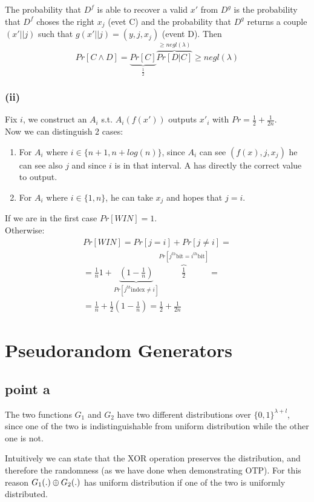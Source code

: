 \documentclass[11pt]{article}
\newcounter{t0d0_counter}
\begin{document}
The probability that $D^f$ is able to recover a valid $x'$ from $D^g$ is the probability that $D^f$ choses the right $x_j$ (evet C) and the probability that $D^g$ returns a couple $(x'||j)$ such that $g(x'||j)=(y,j,x_j)$ (event D). Then \[
Pr[C\wedge D]=\underbrace{Pr[C]}_{\frac{1}{2}}\overbrace{Pr[D|C]}^{\geq negl(\lambda)}\geq negl(\lambda)
\]

\subsubsection{(ii)}

Fix $i$, we construct an $A_i$ s.t. $A_i(f(x\prime))$ outputs $x\prime _i$ with $Pr=\frac{1}{2}+\frac{1}{2n}$.\\
Now we can distinguish 2 cases:
\begin{enumerate}
   \item For $A_i$ where $i \in \{n+1, n+log(n)\}$, since $A_i$ can see $(f(x),j,x_j)$ he can see also $j$ and since $i$ is in that interval. A has directly the correct value to output.
   \item For $A_i$ where $i \in \{1, n\}$, he can take $x_j$ and hopes that $j=i$.
\end{enumerate}

\noindent If we are in the first case $Pr[WIN]=1$.\\
Otherwise: \\
\begin{gather*}
   Pr[WIN]=Pr[j=i]+Pr[j \neq i]=\\
   =\frac{1}{n}1 +\underbrace{(1-\frac{1}{n})}_{Pr[j^{th} \text{index} \neq i]}\overbrace{\frac{1}{2}}^{Pr[j^{th}\text{bit}=i^{th}\text{bit}]}=\\
   =\frac{1}{n}+\frac{1}{2}(1-\frac{1}{n})=\frac{1}{2}+\frac{1}{2n}
\end{gather*}

\section{Pseudorandom Generators}
\subsection{point a}

The two functions $G_{1}$ and $G_{2}$ have two different distributions over
$\{0,1\}^{\lambda + l}$, since one of the two is indistinguishable from uniform
distribution while the other one is not.

Intuitively we can state that the XOR operation preserves the distribution, and therefore the randomness (as we have done when demonstrating OTP). For this reason $G_{1}(.) \oplus G_{2}(.)$ has uniform distribution if one of the two is uniformly distributed.
\end{document}
